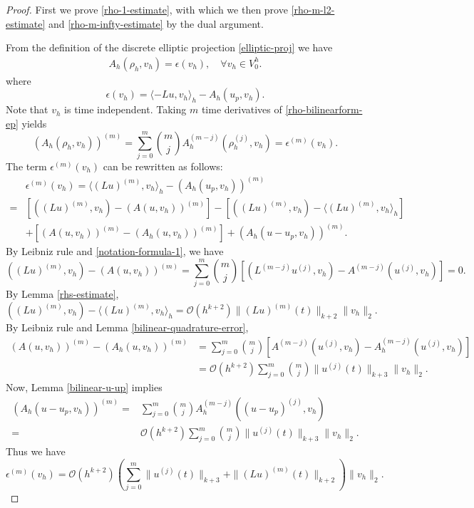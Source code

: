 \documentclass[onefignum,onetabnum]{siamart171218}
\begin{document}
\begin{proof}
First we prove \eqref{rho-1-estimate}, with which  we then  prove \eqref{rho-m-l2-estimate} and \eqref{rho-m-infty-estimate} by the dual argument.

From the definition of  the  discrete elliptic projection \eqref{elliptic-proj} we have
\begin{align}\label{rho-bilinearform-ep}
A_h(\rho_h, v_h) = \epsilon(v_h), \quad \forall v_h \in V^h_0.
\end{align}
where 
\[\epsilon(v_h) = \langle  - Lu, v_h \rangle_h - A_h(u_p,v_h).\]
Note that $v_h$ is time independent. 
Taking $m$ time derivatives of \eqref{rho-bilinearform-ep} yields 
\begin{equation}\label{dt-A-rho}
\left(A_h(\rho_h, v_h)\right)^{(m)} =\sum_{j=0}^m {m\choose j} A_h^{(m-j)}( \rho^{(j)}_h,v_h)= \epsilon^{(m)}(v_h).
\end{equation}
The term $\epsilon^{(m)}(v_h)$ can be rewritten as follows:
\begin{equation*}
\begin{aligned}
& \epsilon^{(m)}(v_h) = \langle (Lu)^{(m)} ,v_h \rangle_h - (A_{h}(u_p,v_h))^{(m)}  \\
= & \left[((Lu)^{(m)} ,v_h ) - (A(u,v_h))^{(m)}\right] -\left[ ((Lu)^{(m)} ,v_h )- \langle (Lu)^{(m)} ,v_h \rangle_h\right] \\ 
&+ \left[(A(u,v_h))^{(m)}-(A_h(u,v_h))^{(m)}\right] + \left(A_{h}(u-u_p,v_h)\right)^{(m)}. 
\end{aligned}
\end{equation*}
By Leibniz rule and \eqref{notation-formula-1}, we have 
\[ ((Lu)^{(m)} ,v_h ) - (A(u,v_h))^{(m)}=\sum_{j=0}^m {m\choose j} \left[(L^{(m-j)} u^{(j)}, v_h)-A^{(m-j)}( u^{(j)},v_h)\right] =0.\]
By Lemma \ref{rhs-estimate}, 
\[((Lu)^{(m)} ,v_h )- \langle (Lu)^{(m)} ,v_h \rangle_h=\mathcal O(h^{k+2})\|(Lu)^{(m)}( t)\|_{k+2} \|v_h\|_2.\]
By Leibniz rule and  Lemma \ref{bilinear-quadrature-error},
\begin{align*} (A(u,v_h))^{(m)}-(A_h(u,v_h))^{(m)}&= \sum_{j=0}^m {m\choose j} \left[A^{(m-j)}(u^{(j)},v_h)-A_h^{(m-j)}(u^{(j)},v_h)\right]\\
&=\mathcal O(h^{k+2}) \sum_{j=0}^m {m\choose j} \|u^{(j)}( t)\|_{k+3}\|v_h\|_2. \end{align*}
 Now,  Lemma \ref{bilinear-u-up} implies
\begin{align*}
\left(A_{h}(u-u_p,v_h)\right)^{(m)}= & \sum_{j=0}^m {m\choose j} A_h^{(m-j)}\left( (u-u_p)^{(j)},v_h\right)\\
= & \mathcal O(h^{k+2}) \sum_{j=0}^m {m\choose j} \|u^{(j)}( t)\|_{k+3}\|v_h\|_2. 
\end{align*}
Thus we have
\begin{equation}
\label{epsilon-m-estimate}
\epsilon^{(m)}(v_h) =  \mathcal O(h^{k+2})\left(\sum_{j=0}^m \|u^{(j)}( t)\|_{k+3}+\|(Lu)^{(m)}( t)\|_{k+2}\right)\|v_h\|_2.
\end{equation}


\end{proof}
\end{document}

